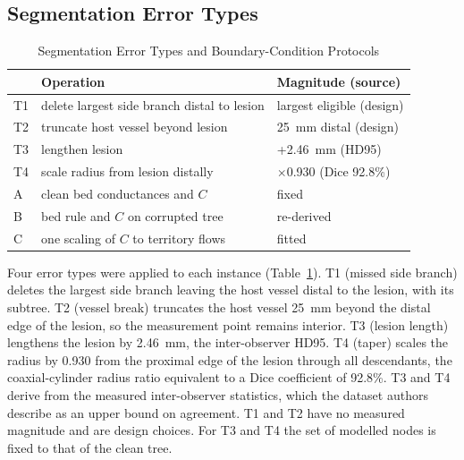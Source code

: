 \documentclass[journal]{IEEEtran}
\begin{document}
\subsection{Segmentation Error Types}
\begin{table}[!t]
\caption{Segmentation Error Types and Boundary-Condition Protocols}
\label{tab:design}
\centering\footnotesize
\begin{tabular}{@{}p{0.9cm}p{3.6cm}p{2.9cm}@{}}
\toprule
 & Operation & Magnitude (source)\\
\midrule
T1 & delete largest side branch distal to lesion & largest eligible (design)\\
T2 & truncate host vessel beyond lesion & 25~mm distal (design)\\
T3 & lengthen lesion & +2.46~mm (HD95)\\
T4 & scale radius from lesion distally & $\times$0.930 (Dice 92.8\%)\\
\midrule
A & clean bed conductances and $C$ & fixed\\
B & bed rule and $C$ on corrupted tree & re-derived\\
C & one scaling of $C$ to territory flows & fitted\\
\bottomrule
\end{tabular}
\end{table}
Four error types were applied to each instance (Table~\ref{tab:design}). T1 (missed side branch) deletes the largest
side branch leaving the host vessel distal to the lesion, with its subtree. T2 (vessel break) truncates the host
vessel 25~mm beyond the distal edge of the lesion, so the measurement point remains interior. T3 (lesion length)
lengthens the lesion by 2.46~mm, the inter-observer HD95. T4 (taper) scales the radius by 0.930 from the proximal
edge of the lesion through all descendants, the coaxial-cylinder radius ratio equivalent to a Dice coefficient of
92.8\%. T3 and T4 derive from the measured inter-observer statistics, which the dataset authors describe as an upper
bound on agreement. T1 and T2 have no measured magnitude and are design choices. For T3 and T4 the set of modelled
nodes is fixed to that of the clean tree.
\end{document}

